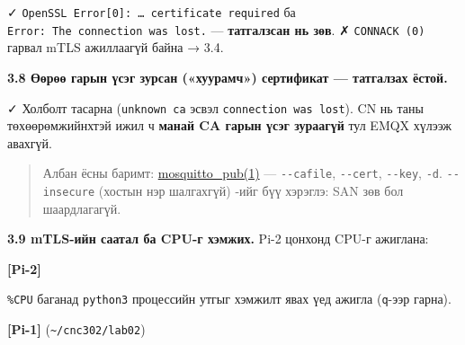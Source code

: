✓ \texttt{OpenSSL\ Error{[}0{]}:\allowbreak{}\ \ldots{}\ certificate\ required} ба \texttt{Error:\allowbreak{}\ The\ connection\ was\ lost.\allowbreak{}} --- \textbf{татгалзсан нь зөв}. ✗ \texttt{CONNACK\ (0)} гарвал mTLS ажиллаагүй байна → 3.4.

\textbf{3.8 Өөрөө гарын үсэг зурсан («хуурамч») сертификат --- татгалзах ёстой.}

\begin{Shaded}
\begin{Highlighting}[]
 \KeywordTok{\textbackslash{}}
\KeywordTok{\textbackslash{}}
\end{Highlighting}
\end{Shaded}

✓ Холболт тасарна (\texttt{unknown\ ca} эсвэл \texttt{connection\ was\ lost}). CN нь таны төхөөрөмжийнхтэй ижил ч \textbf{манай CA гарын үсэг зураагүй} тул EMQX хүлээж авахгүй.

\begin{quote}
Албан ёсны баримт: \href{https://mosquitto.org/man/mosquitto_pub-1.html}{mosquitto\_pub(1)} --- \texttt{-\/-cafile}, \texttt{-\/-cert}, \texttt{-\/-key}, \texttt{-d}. \texttt{-\/-insecure} (хостын нэр шалгахгүй) -ийг бүү хэрэглэ: SAN зөв бол шаардлагагүй.
\end{quote}

\textbf{3.9 mTLS-ийн саатал ба CPU-г хэмжих.} Pi-2 цонхонд CPU-г ажиглана:

\textbf{{[}Pi-2{]}}

\begin{Shaded}
\begin{Highlighting}[]
\end{Highlighting}
\end{Shaded}

\texttt{\%CPU} баганад \texttt{python3} процессийн утгыг хэмжилт явах үед ажигла (\texttt{q}-ээр гарна).

\textbf{{[}Pi-1{]}} (\texttt{\textasciitilde{}/cnc302/lab02})

